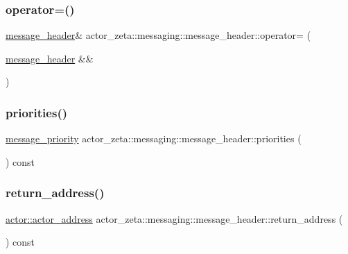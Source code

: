 \subsubsection{\texorpdfstring{operator=()}{operator=()}\hspace{0.1cm}{\footnotesize\ttfamily [2/2]}}
{\footnotesize\ttfamily \hyperlink{classactor__zeta_1_1messaging_1_1message__header}{message\+\_\+header}\& actor\+\_\+zeta\+::messaging\+::message\+\_\+header\+::operator= (\begin{DoxyParamCaption}\item[{\hyperlink{classactor__zeta_1_1messaging_1_1message__header}{message\+\_\+header} \&\&}]{ }\end{DoxyParamCaption})\hspace{0.3cm}{\ttfamily [default]}}

\mbox{\label{classactor__zeta_1_1messaging_1_1message__header_a7082ab0c21345aabd9ecaf5b6e5c2575}} 
\subsubsection{\texorpdfstring{priorities()}{priorities()}}
{\footnotesize\ttfamily \hyperlink{namespaceactor__zeta_1_1messaging_a1b4c4b3ab625eb033c15da4fbe9c4a89}{message\+\_\+priority} actor\+\_\+zeta\+::messaging\+::message\+\_\+header\+::priorities (\begin{DoxyParamCaption}{ }\end{DoxyParamCaption}) const}

\mbox{\label{classactor__zeta_1_1messaging_1_1message__header_af30d8c985437c398fa16c0d8ad8783a5}} 
\subsubsection{\texorpdfstring{return\+\_\+address()}{return\_address()}}
{\footnotesize\ttfamily \hyperlink{classactor__zeta_1_1actor_1_1actor__address}{actor\+::actor\+\_\+address} actor\+\_\+zeta\+::messaging\+::message\+\_\+header\+::return\+\_\+address (\begin{DoxyParamCaption}{ }\end{DoxyParamCaption}) const}

